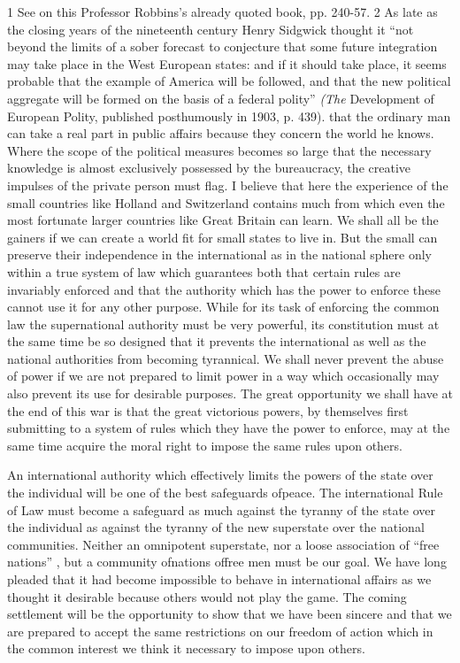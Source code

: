 \documentclass[11pt,openany]{book}
\begin{document}
1 See on this Professor Robbins's already quoted book, pp. 240-57. 2 As late as the closing years of the nineteenth century Henry Sidgwick thought it ``not beyond the limits of a sober forecast to conjecture that some future integration may take place in the West European states: and if it should take place, it seems probable that the example of America will be followed, and that the new political aggregate will be formed on the basis of a federal polity'' \emph{(The} Development of European Polity, published posthumously in 1903, p. 439). that the ordinary man can take a real part in public affairs because they concern the world he knows. Where the scope of the political measures becomes so large that the necessary knowledge is almost exclusively possessed by the bureaucracy, the creative impulses of the private person must flag. I believe that here the experience of the small countries like Holland and Switzerland contains much from which even the most fortunate larger countries like Great Britain can learn. We shall all be the gainers if we can create a world fit for small states to live in. But the small can preserve their independence in the international as in the national sphere only within a true system of law which guarantees both that certain rules are invariably enforced and that the authority which has the power to enforce these cannot use it for any other purpose. While for its task of enforcing the common law the supernational authority must be very powerful, its constitution must at the same time be so designed that it prevents the international as well as the national authorities from becoming tyrannical. We shall never prevent the abuse of power if we are not prepared to limit power in a way which occasionally may also prevent its use for desirable purposes. The great opportunity we shall have at the end of this war is that the great victorious powers, by themselves first submitting to a system of rules which they have the power to enforce, may at the same time acquire the moral right to impose the same rules upon others.

An international authority which effectively limits the powers of the state over the individual will be one of the best safeguards ofpeace. The international Rule of Law must become a safeguard as much against the tyranny of the state over the individual as against the tyranny of the new superstate over the national communities. Neither an omnipotent superstate, nor a loose association of ``free nations'' , but a community ofnations offree men must be our goal. We have long pleaded that it had become impossible to behave in international affairs as we thought it desirable because others would not play the game. The coming settlement will be the opportunity to show that we have been sincere and that we are prepared to accept the same restrictions on our freedom of action which in the common interest we think it necessary to impose upon others.
\end{document}
